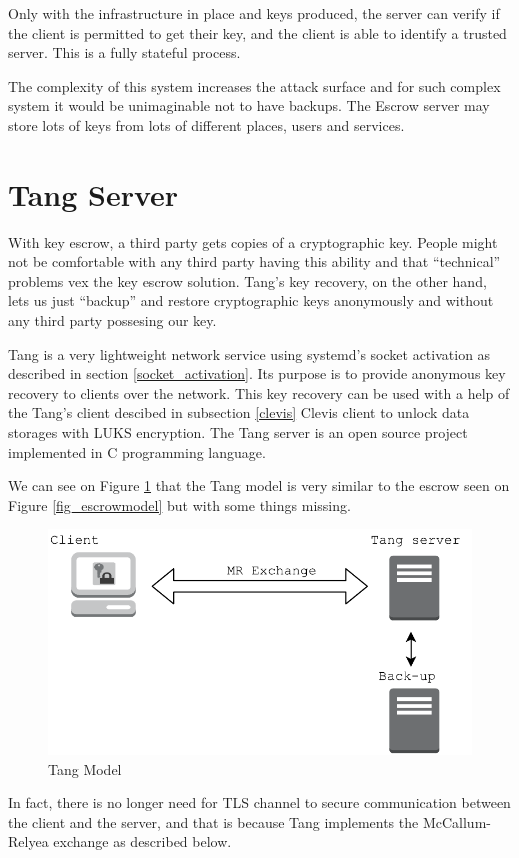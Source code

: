 Only with the infrastructure in place and keys produced, the server can verify if the client is permitted to get their key, and the client is able to identify a trusted server.
This is a fully stateful process.

The complexity of this system increases the attack surface and for such complex system it would be unimaginable not to have backups.
The Escrow server may store lots of keys from lots of different places, users and services.



\section{Tang Server}\label{tang}

With key escrow, a third party gets copies of a cryptographic key.
People might not be comfortable with any third party having this ability and that “technical” problems vex the key escrow solution.
Tang's key recovery, on the other hand, lets us just “backup” and restore cryptographic keys anonymously and without any third party possesing our key.

Tang is a very lightweight network service using systemd's socket activation as described in section \ref{socket_activation}.
Its purpose is to provide anonymous key recovery to clients over the network.
This key recovery can be used with a help of the Tang's client descibed in subsection \ref{clevis} Clevis client to unlock data storages with LUKS encryption.
The Tang server is an open source project implemented in C programming language.

We can see on Figure \ref{fig_tangmodel} that the Tang model is very similar to the escrow seen on Figure \ref{fig_escrowmodel} but with some things missing.
\begin{figure}[h]
    \centering
    \includegraphics[scale=0.7]{figures/TangModel.pdf}
    \caption{Tang Model}
    \label{fig_tangmodel}
\end{figure}
In fact, there is no longer need for TLS channel to secure communication between the client and the server,
 and that is because Tang implements the McCallum-Relyea exchange as described below.

